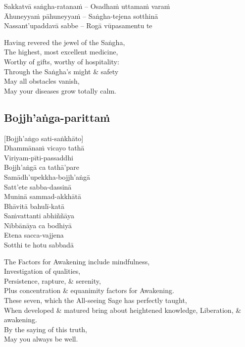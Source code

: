 Sakkatvā saṅgha-ratanaṁ – Osadhaṁ uttamaṁ varaṁ\\
Āhuneyyaṁ pāhuneyyaṁ – Saṅgha-tejena sotthinā\\
Nassant’upaddavā sabbe – Rogā vūpasamentu te

\begin{english}
  Having revered the jewel of the Saṅgha,\\
  The highest, most excellent medicine,\\
  Worthy of gifts, worthy of hospitality:\\
  Through the Saṅgha’s might \& safety\\
  May all obstacles vanish,\\
  May your diseases grow totally calm.
\end{english}

\suttaRef{[MJG]}

\subsection{Bojjh’aṅga-parittaṁ}
\label{bojjhana-parittam}
[Bojjh’aṅgo sati-saṅkhāto]\\
Dhammānaṁ vicayo tathā\\
Viriyam-pīti-passaddhi\\
Bojjh’aṅgā ca tathā’pare\\
Samādh’upekkha-bojjh’aṅgā\\
Satt’ete sabba-dassinā\\
Muninā sammad-akkhātā\\
Bhāvitā bahulī-katā\\
Saṁvattanti abhiññāya\\
Nibbānāya ca bodhiyā\\
Etena sacca-vajjena\\
Sotthi te hotu sabbadā

\begin{english}
  The Factors for Awakening include mindfulness,\\
  Investigation of qualities,\\
  Persistence, rapture, \& serenity,\\
  Plus concentration \& equanimity factors for Awakening.\\
  These seven, which the All-seeing Sage has perfectly taught,\\
  When developed \& matured bring about heightened knowledge, Liberation, \& awakening.\\
  By the saying of this truth,\\
  May you always be well.
\end{english}

